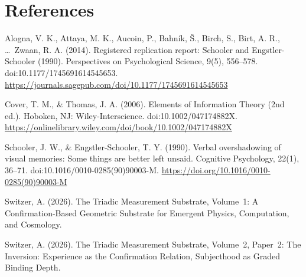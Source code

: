 \documentclass[11pt,oneside]{report}
\theoremstyle{definition}
\theoremstyle{remark}
\newenvironment{reflist}
  {\par\small\setlength{\parindent}{0pt}%
   \setlength{\leftskip}{1.6em}\setlength{\parindent}{-1.6em}%
   \setlength{\parskip}{0.4em}%
   \raggedright\hyphenpenalty=50\exhyphenpenalty=50\relax
   \sloppy}
  {\par}
\begin{document}
\section*{References}
\begin{reflist}
Alogna, V. K., Attaya, M. K., Aucoin, P., Bahn\'ik, \v{S}., Birch, S., Birt,
A. R., \ldots\ Zwaan, R. A. (2014). Registered replication report: Schooler
and Engstler-Schooler (1990). Perspectives on Psychological Science, 9(5),
556--578. doi:10.1177/1745691614545653.
\url{https://journals.sagepub.com/doi/10.1177/1745691614545653}

Cover, T. M., \& Thomas, J. A. (2006). Elements of Information Theory (2nd
ed.). Hoboken, NJ: Wiley-Interscience. doi:10.1002/047174882X.
\url{https://onlinelibrary.wiley.com/doi/book/10.1002/047174882X}

Schooler, J. W., \& Engstler-Schooler, T. Y. (1990). Verbal overshadowing of
visual memories: Some things are better left unsaid. Cognitive Psychology,
22(1), 36--71. doi:10.1016/0010-0285(90)90003-M.
\url{https://doi.org/10.1016/0010-0285(90)90003-M}

Switzer, A. (2026). The Triadic Measurement Substrate, Volume~1: A
Confirmation-Based Geometric Substrate for Emergent Physics, Computation, and
Cosmology.

Switzer, A. (2026). The Triadic Measurement Substrate, Volume~2, Paper~2: The
Inversion: Experience as the Confirmation Relation, Subjecthood as Graded
Binding Depth.
\end{reflist}
\end{document}

